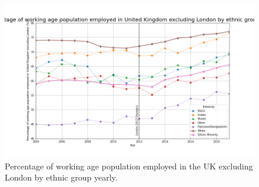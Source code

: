 \documentclass[12pt,twoside]{article}
\begin{document}
\begin{figure}[!htb]
\centering
\includegraphics[width=0.9\linewidth]{figures/percentages-United Kingdom excluding London.png}
\caption{Percentage of working age population employed in the UK excluding London by ethnic group yearly.}
\label{fig:perc-uk-no-london}
\end{figure}


\end{document}
